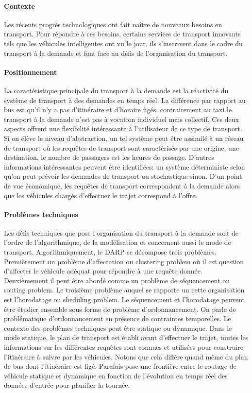 \documentclass{article}
\begin{document}
\paragraph{Contexte}
Les récents progrès technologiques ont fait naître de nouveaux besoins en transport. Pour répondre à ces besoins, certains services de transport innovants tels que les véhicules intelligentes ont vu le jour, ils s'inscrivent dans le cadre du transport à la demande et font face au défis de l'organisation du transport.

\paragraph{Positionnement}
La caractéristique principale du transport à la demande est la réactivité du système de transport à des demandes en temps réel. La différence par rapport au bus est qu'il n'y a pas d'itinéraire et d'horaire figés, contrairement au taxi le transport à la demande n'est pas à vocation individuel mais collectif. Ces deux aspects offrent une flexibilité  intéressante à l'utilisateur de ce type de transport. Si on élève le niveau d'abstraction, un tel système peut être assimilé à un réseau de transport où les requêtes de transport sont caractérisés par une origine, une destination, le nombre de passagers est les heures de passage. D'autres informations intéressantes peuvent être identifiées: un système déterministe selon qu'on peut prévoir les demandes de transport ou stochastique sinon. D'un point de vue économique, les requêtes de transport correspondent à la demande alors que les véhicules chargés d'effectuer le trajet correspond à l'offre. 

\paragraph{Problèmes techniques}
Les défis techniques que pose l'organisation du transport à la demande sont de l'ordre de l'algorithmique, de la modélisation et concernent aussi le mode de transport. Algorithmiquement, le DARP se décompose trois problèmes. Premièrement un problème d'affectation ou clustering problem où il est question d'affecter le véhicule adéquat pour répondre à une requête donnée. Deuxièmement il peut être abordé comme un problème de séquencement ou routing problem. Le troisième problème auquel se rapporte un cette organisation est l'horodatage ou sheduling problem. Le séquencement et l'horodatage peuvent être étudier ensemble sous forme de problème d'ordonnancement. On parle de problématique d'ordonnancement en présence de contraintes temporelles. Le contexte des problèmes techniques peut être statique ou dynamique. Dans le mode statique, le plan de transport est établi avant d'effectuer le trajet, toutes les informations sur les différentes requêtes sont connues et utilisées pour construire l'itinéraire à suivre par les véhicules. Notons que cela diffère quand même du plan de bus dont l'itinéraire est figé. Parafais \cite{Parafais} pose une frontière entre le routage de véhicule statique et dynamique en fonction de l'évolution en temps réel des données d'entrée pour planifier la tournée.
\end{document}
